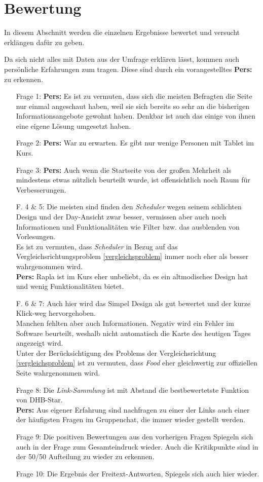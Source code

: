 \section{Bewertung}
In diesem Abschnitt werden die einzelnen Ergebnisse bewertet und versucht erklängen dafür zu geben.

Da sich nicht alles mit Daten aus der Umfrage erklären lässt, kommen auch persönliche Erfahrungen zum tragen. Diese sind durch ein vorangestelltes \textbf{Pers:} zu erkennen. 

\begin{itemize}
\item[Frage 1:]
	{\textbf{Pers:} Es ist zu vermuten, dass sich die meisten Befragten die Seite nur einmal angeschaut haben, weil sie sich bereits so sehr an die bisherigen Informationsangebote gewohnt haben. Denkbar ist auch das einige von ihnen eine eigene Lösung umgesetzt haben. }
\item[Frage 2:]
	{\textbf{Pers:} War zu erwarten. Es gibt nur wenige Personen mit Tablet im Kurs. }
\item[Frage 3:]
	{\textbf{Pers:} Auch wenn die Startseite von der großen Mehrheit als mindestens etwas nützlich beurteilt wurde, ist offensichtlich noch Raum für Verbesserungen.}
\item[F. 4 \& 5:]
	{Die meisten sind finden den \emph{Scheduler} wegen seinem schlichten Design und der Day-Ansicht zwar besser, vermissen aber auch noch Informationen und Funktionalitäten wie Filter bzw. das ausblenden von Vorlesungen. \\
	Es ist zu vermuten, dass \emph{Scheduler} in Bezug auf das Vergleichsrichtungsproblem \ref{vergleichsproblem} immer noch eher als besser wahrgenommen wird.\\
	\textbf{Pers:} Rapla ist im Kurs eher unbeliebt, da es ein altmodisches Design hat und wenig Funktionalitäten bietet.
	}
\item[F. 6 \& 7:]
	{Auch hier wird das Simpel Design als gut bewertet und der kurze Klick-weg hervorgehoben. \\
	Manchen fehlten aber auch Informationen. Negativ wird ein Fehler im Software beurteilt, weshalb nicht automatisch die Karte des heutigen Tages angezeigt wird.\\
	Unter der Berücksichtigung des Problems der Vergleichsrichtung \ref{vergleichsproblem} ist zu vermuten, dass \emph{Food} eher gleichwertig zur offiziellen Seite wahrgenommen wird.}
\item [Frage 8:]
	{Die \emph{Link-Sammlung} ist mit Abstand die bestbewertetste Funktion von DHB-Star. \\
	\textbf{Pers:} Aus eigener Erfahrung sind nachfragen zu einer der Links auch einer der häufigsten Fragen im Gruppenchat, die immer wieder gestellt werden. }
\item [Frage 9:]
	{Die positiven Bewertungen aus den vorherigen Fragen Spiegeln sich auch in der Frage zum Gesamteindruck wieder. Auch die Kritikpunkte sind in der 50/50 Aufteilung zu wieder zu erkennen. }
\item [Frage 10:]
	{Die Ergebnis der Freitext-Antworten, Spiegels sich auch hier wieder.}
\end{itemize}

